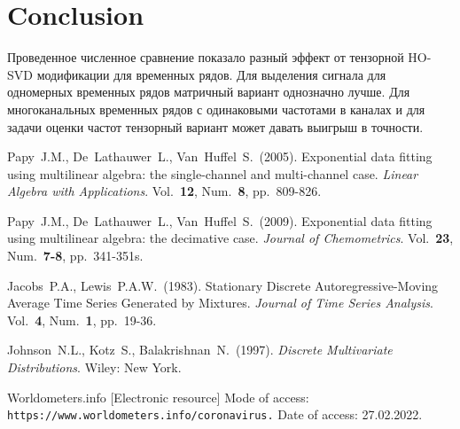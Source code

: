 \documentclass[12pt]{article}
\theoremstyle{definition}
\theoremstyle{remark}
\begin{document}


\section{Conclusion}
Проведенное численное сравнение показало разный эффект от тензорной HO-SVD модификации для временных рядов.
Для выделения сигнала для одномерных временных рядов матричный вариант однозначно лучше.
Для многоканальных временных рядов с одинаковыми частотами в каналах и для задачи оценки частот тензорный вариант может давать выигрыш в точности.

\begin{thebibliography}{10}

  Papy~J.M., De~Lathauwer~L., Van~Huffel~S.~(2005).
  Exponential data fitting using multilinear algebra: the
  single-channel and multi-channel case.
  {\sl Linear Algebra with Applications}. Vol.~{\bf 12}, Num.~{\bf 8},
  pp.~809-826.

  Papy~J.M., De~Lathauwer~L., Van~Huffel~S.~(2009).
  Exponential data fitting using multilinear algebra: the decimative case.
  {\sl Journal of Chemometrics}. Vol.~{\bf 23}, Num.~{\bf 7-8},
  pp.~341-351s.

  Jacobs~P.A., Lewis~P.A.W.~(1983). Stationary Discrete
  Autoregressive-Moving Average
  Time Series Generated by Mixtures. {\sl Journal of Time Series
  Analysis}. Vol.~{\bf 4}, Num.~{\bf 1},
  pp.~19-36.

  Johnson~N.L., Kotz~S., Balakrishnan~N.~(1997). {\sl Discrete
  Multivariate Distributions}. Wiley: New York.

  Worldometers.info [Electronic resource] Mode of access:
  \texttt{https://www.worldometers.info/coronavirus.} Date of access:
  27.02.2022.

\end{thebibliography}
\end{document}
